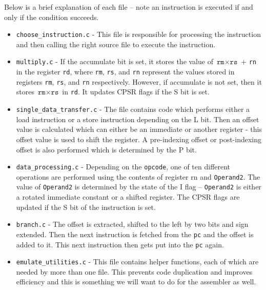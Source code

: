 \documentclass[11pt]{article}
\begin{document}
Below is a brief explanation of each file – note an instruction is executed if and only if the condition succeeds. 
\begin{itemize}
    \item \texttt{choose\_instruction.c} - This file is responsible for processing the instruction and then calling the right source file to execute the instruction. 
    \item \texttt{multiply.c} - If the accumulate bit is set, it stores the value of $\texttt{rm} \times \texttt{rs}$ + \texttt{rn} in the register \texttt{rd}, where \texttt{rm}, \texttt{rs}, and \texttt{rn} represent the values stored in registers \texttt{rm}, \texttt{rs}, and \texttt{rn} respectively. However, if accumulate is not set, then it stores $\texttt{rm} \times \texttt{rs}$ in \texttt{rd}. It updates CPSR flags if the S bit is set. 
    \item \texttt{single\_data\_transfer.c} - The file contains code which performs either a load instruction or a store instruction depending on the L bit. Then an offset value is calculated which can either be an immediate or another register - this offset value is used to shift the register. A pre-indexing offset or post-indexing offset is also performed which is determined by the P bit. 
    \item \texttt{data\_processing.c} - Depending on the \texttt{opcode}, one of ten different operations are performed using the contents of register rn and \texttt{Operand2}. The value of \texttt{Operand2} is determined by the state of the I flag – \texttt{Operand2} is either a rotated immediate constant or a shifted register. The CPSR flags are updated if the S bit of the instruction is set. 
    \item \texttt{branch.c} - The offset is extracted, shifted to the left by two bits and sign extended. Then the next instruction is fetched from the \texttt{pc} and the offset is added to it. This next instruction then gets put into the \texttt{pc} again. 
    \item \texttt{emulate\_utilities.c} - This file contains helper functions, each of which are needed by more than one file. This prevents code duplication and improves efficiency and this is something we will want to do for the assembler as well. 
    
\end{itemize}
\end{document}
